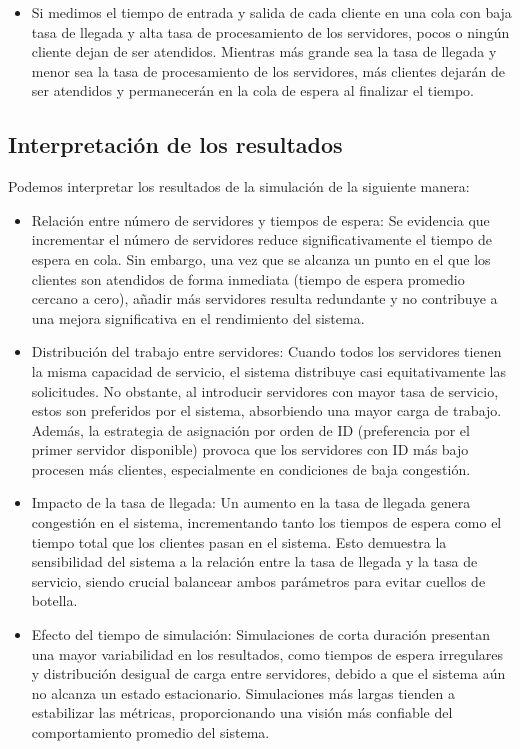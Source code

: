\documentclass[12pt,a4paper]{article}
\begin{document}
\begin{itemize}
\item Si medimos el tiempo de entrada y salida de cada cliente en una cola con baja tasa de llegada y alta tasa de procesamiento de los servidores, pocos o ningún cliente dejan de ser atendidos. Mientras más grande sea la tasa de llegada y menor sea la tasa de  procesamiento de los servidores, más clientes dejarán de ser atendidos y permanecerán en la cola de espera al finalizar el tiempo.
\end{itemize}

\subsection{Interpretación de los resultados}
Podemos interpretar los resultados de la simulación de la siguiente manera:
\begin{itemize}
\item Relación entre número de servidores y tiempos de espera: Se evidencia que incrementar el número de servidores reduce  significativamente el tiempo de espera en cola. Sin embargo, una vez que se alcanza un punto en el que los clientes son atendidos de forma inmediata (tiempo de espera promedio cercano a cero), añadir más servidores resulta redundante y no contribuye a una  mejora significativa en el rendimiento del sistema.
\item Distribución del trabajo entre servidores: Cuando todos los servidores tienen la misma capacidad de servicio, el sistema  distribuye casi equitativamente las solicitudes. No obstante, al introducir servidores con mayor tasa de servicio, estos son  preferidos por el sistema, absorbiendo una mayor carga de trabajo. Además, la estrategia de asignación por orden de ID  (preferencia por el primer servidor disponible) provoca que los servidores con ID más bajo procesen más clientes, especialmente en condiciones de baja congestión.
\item Impacto de la tasa de llegada: Un aumento en la tasa de llegada genera congestión en el sistema, incrementando tanto los tiempos de espera como el tiempo total que los clientes pasan en el sistema. Esto demuestra la sensibilidad del sistema a la relación entre la tasa de llegada y la tasa de servicio, siendo crucial balancear ambos parámetros para evitar cuellos de botella.
\item Efecto del tiempo de simulación: Simulaciones de corta duración presentan una mayor variabilidad en los resultados, como tiempos de espera irregulares y distribución desigual de carga entre servidores, debido a que el sistema aún no alcanza un estado  estacionario. Simulaciones más largas tienden a estabilizar las métricas, proporcionando una visión más confiable del  comportamiento promedio del sistema.

\end{itemize}
\end{document}
